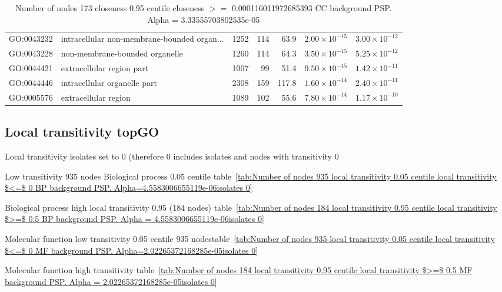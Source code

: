 \begin{table}[ht]
\begin{adjustbox}{max width=\textwidth}
\begin{tabular}{llrrrrr}
  GO:0043232 & intracellular non-membrane-bounded organ... & 1252 & 114 & 63.9 & $2.00 \times 10^{-15}$ & $3.00 \times 10^{-12}$ \\ 
  GO:0043228 & non-membrane-bounded organelle & 1260 & 114 & 64.3 & $3.50 \times 10^{-15}$ & $5.25 \times 10^{-12}$ \\ 
  GO:0044421 & extracellular region part & 1007 & 99 & 51.4 & $9.50 \times 10^{-15}$ & $1.42 \times 10^{-11}$ \\ 
  GO:0044446 & intracellular organelle part & 2308 & 159 & 117.8 & $1.60 \times 10^{-14}$ & $2.40 \times 10^{-11}$ \\ 
  GO:0005576 & extracellular region & 1089 & 102 & 55.6 & $7.80 \times 10^{-14}$ & $1.17 \times 10^{-10}$ \\ 
   \hline
\end{tabular}
\end{adjustbox}
\caption{Number of nodes 173 closeness 0.95 centile  closeness $>=$ 0.000116011972685393 CC background PSP. Alpha = 3.33555703802535e-05} 
\label{tab:Number of nodes 173 closeness 0.95 centile  closeness $>=$ 0.000116011972685393 CC background PSP. Alpha = 3.33555703802535e-05}
\end{table}

\subsection{Local transitivity topGO}

Local transitivity isolates set to 0 (therefore 0 includes isolates and nodes with transitivity 0

Low transitivity 935 nodes Biological process 0.05 centile table~\ref{tab:Number of nodes 935 local transitivity 0.05 centile  local transitivity $<=$ 0 BP background PSP. Alpha=4.5583006655119e-06isolates 0}

Biological process high local transitivity 0.95 (184 nodes) table~\ref{tab:Number of nodes 184 local transitivity 0.95 centile  local transitivity $>=$ 0.5 BP background PSP. Alpha = 4.5583006655119e-06isolates 0}

Molecular function low transitivity 0.05 centile 935 nodestable~\ref{tab:Number of nodes 935 local transitivity 0.05 centile  local transitivity $<=$ 0 MF background PSP. Alpha=2.02265372168285e-05isolates 0}

Molecular function high transitivity table~\ref{tab:Number of nodes 184 local transitivity 0.95 centile  local transitivity $>=$ 0.5 MF background PSP. Alpha = 2.02265372168285e-05isolates 0}

